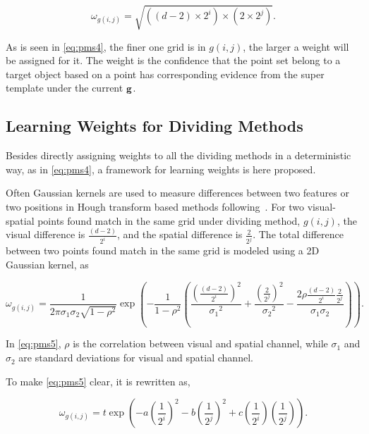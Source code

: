 \begin{equation}
\label{eq:pms4}
\omega_{g(i,j)}=\sqrt{ ((d-2)\times{2^i})\times(2 \times {2^j})  }.
\end{equation}

As is seen in \ref{eq:pms4}, the finer one grid is in $g(i,j)$, the larger a weight will be assigned for it. The weight is the confidence that the point set belong to a target object based on a point has corresponding evidence from the super template under the current $\bf g$.

\subsection{Learning Weights for Dividing Methods}
Besides directly assigning weights to all the dividing methods in a deterministic way, as in \ref{eq:pms4}, a framework for learning weights is here proposed.

Often Gaussian kernels are used to measure differences between two features or two positions in Hough transform based methods following~\citep{lb1}.
For two visual-spatial points found match in the same grid under dividing method, $g(i,j)$,
the visual difference  is  $ \frac {(d-2)}{2^i}$, and the spatial difference is  $ \frac 2 {2^j}$.
The total difference between two points found match in the same grid is modeled using a 2D Gaussian kernel, as

\begin{equation}
\label{eq:pms5}
\omega_{g(i,j)}=\frac 1 {2 \pi \sigma_1 \sigma_2 \sqrt{1-\rho^2} }\exp(- \frac 1 {1-\rho^2} ( \frac {(\frac {(d-2)}{2^i})^2} {{\sigma_1}^2}
+ \frac {(\frac {2}{2^j})^2} {{\sigma_2}^2}  - \frac {2 \rho \frac {(d-2)}{2^i}  \frac 2 {2^j}}{\sigma_1 \sigma_2} )).
\end{equation}


In \ref{eq:pms5}, $\rho$ is the correlation between visual and spatial channel, while $\sigma_1$ and $\sigma_2$ are standard deviations for visual and spatial channel.

To make \ref{eq:pms5} clear, it is rewritten as,

\begin{equation}
\label{eq:pms6}
\omega_{g(i,j)}= t \exp(-a (\frac 1 {2^i})^2 - b (\frac 1 {2^j})^2 + c (\frac 1 {2^i}) (\frac 1 {2^j})).
\end{equation}

